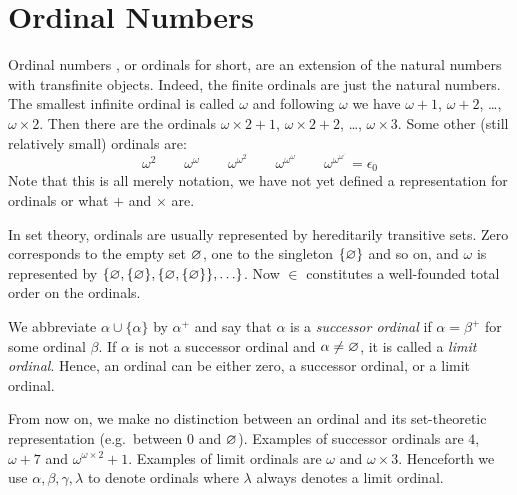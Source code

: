 


\section{Ordinal Numbers}\label{sec:ordinals}

Ordinal numbers \citep{cantor-15}, or ordinals for short, are an
extension of the natural numbers with transfinite objects. Indeed, the
finite ordinals are just the natural numbers. The smallest infinite
ordinal is called $\omega$ and following $\omega$ we have $\omega +
1$, $\omega + 2$, \ldots, $\omega \times 2$. Then there are the
ordinals $\omega \times 2 + 1$, $\omega \times 2 + 2$, \ldots, $\omega
\times 3$. Some other (still relatively small) ordinals are:
\begin{displaymath}
  \omega^2 \qquad
  \omega^\omega \qquad
  \omega^{\omega^2} \qquad
  \omega^{\omega^\omega} \qquad
  \omega^{\omega^{\omega^{\iddots}}} = \epsilon_0
\end{displaymath}
Note that this is all merely notation, we have not yet defined a
representation for ordinals or what $+$ and $\times$ are.

In set theory, ordinals are usually represented by hereditarily transitive
sets. Zero corresponds to the empty set $\varnothing$, one to the
singleton $\{ \varnothing \}$ and so on, and $\omega$ is represented by
$\{ \varnothing, \{ \varnothing \}, \{ \varnothing, \{ \varnothing \} \} , \ldots
\}$. Now $\in$ constitutes a well-founded total order on the
ordinals.

We abbreviate $\alpha \cup \{ \alpha \}$ by $\alpha^+$ and say that
$\alpha$ is a \emph{successor ordinal} if $\alpha = \beta^+$ for some
ordinal $\beta$. If $\alpha$ is not a successor ordinal and $\alpha
\neq \varnothing$, it is called a \emph{limit ordinal}. Hence, an ordinal
can be either zero, a successor ordinal, or a limit ordinal.

From now on, we make no distinction between an ordinal and its set-theoretic
representation (e.g.\ between $0$ and $\varnothing$). Examples of successor
ordinals are $4$, $\omega + 7$  and $\omega^{\omega \times 2} + 1$. Examples
of limit ordinals are $\omega$ and $\omega \times 3$. Henceforth we
use $\alpha, \beta, \gamma, \lambda$ to denote ordinals where
$\lambda$ always denotes a limit ordinal.

